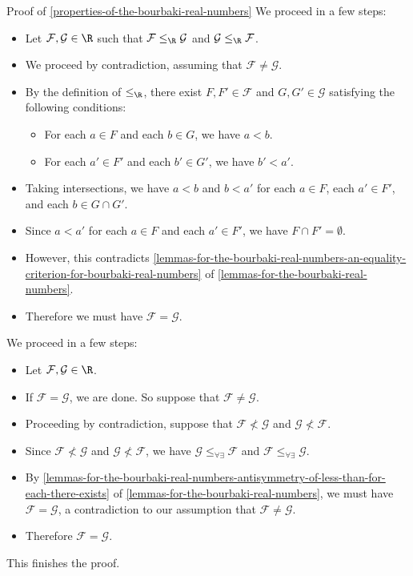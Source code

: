 \begin{Proof}{Proof of \cref{properties-of-the-bourbaki-real-numbers}}
    We proceed in a few steps:
    \begin{itemize}
        \item Let $\mathcal{F},\mathcal{G}\in\R$ such that $\mathcal{F}\leq_{\R}\mathcal{G}$ and $\mathcal{G}\leq_{\R}\mathcal{F}$.
        \item We proceed by contradiction, assuming that $\mathcal{F}\neq\mathcal{G}$.
        \item By the definition of $\leq_{\R}$, there exist $F,F'\in\mathcal{F}$ and $G,G'\in\mathcal{G}$ satisfying the following conditions:
            \begin{itemize}
                \item For each $a\in F$ and each $b\in G$, we have $a\less b$.
                \item For each $a'\in F'$ and each $b'\in G'$, we have $b'\less a'$.
            \end{itemize}
        \item Taking intersections, we have $a\less b$ and $b\less a'$ for each $a\in F$, each $a'\in F'$, and each $b\in G\cap G'$.
        \item Since $a\less a'$ for each $a\in F$ and each $a'\in F'$, we have $F\cap F'=\emptyset$.
        \item However, this contradicts \cref{lemmas-for-the-bourbaki-real-numbers-an-equality-criterion-for-bourbaki-real-numbers} of \cref{lemmas-for-the-bourbaki-real-numbers}.
        \item Therefore we must have $\mathcal{F}=\mathcal{G}$.
    \end{itemize}

    We proceed in a few steps:
    \begin{itemize}
        \item Let $\mathcal{F},\mathcal{G}\in\R$.
        \item If $\mathcal{F}=\mathcal{G}$, we are done. So suppose that $\mathcal{F}\neq\mathcal{G}$.
        \item Proceeding by contradiction, suppose that $\mathcal{F}\nless\mathcal{G}$ and $\mathcal{G}\nless\mathcal{F}$.
        \item Since $\mathcal{F}\nless\mathcal{G}$ and $\mathcal{G}\nless\mathcal{F}$, we have $\mathcal{G}\leq_{\forall\exists}\mathcal{F}$ and $\mathcal{F}\leq_{\forall\exists}\mathcal{G}$.
        \item By \cref{lemmas-for-the-bourbaki-real-numbers-antisymmetry-of-less-than-for-each-there-exists} of \cref{lemmas-for-the-bourbaki-real-numbers}, we must have $\mathcal{F}=\mathcal{G}$, a contradiction to our assumption that $\mathcal{F}\neq\mathcal{G}$.
        \item Therefore $\mathcal{F}=\mathcal{G}$.
    \end{itemize}
    This finishes the proof.


\end{Proof}
